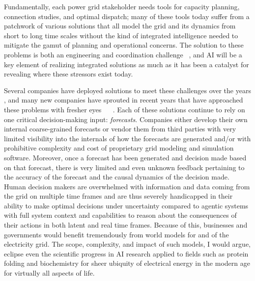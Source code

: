 \documentclass{article}
\begin{document}
Fundamentally, each power grid stakeholder needs tools
for capacity planning, connection studies, and optimal dispatch; many of these tools today suffer
from a patchwork of various solutions that all model the grid and its dynamics from short to long
time scales without the kind of integrated intelligence needed to mitigate the gamut of planning
and operational concerns. The solution to these problems is both an engineering and coordination 
challenge ~\cite{Grindal2026}, and AI will be a key element of realizing integrated solutions as
much as it has been a catalyst for revealing where these stressors exist today.

Several companies have deployed solutions to meet these challenges over the years \cite{OldEnergySoftware}, and many new 
companies have sprouted in recent years that have approached these problems with fresher eyes 
~\cite{Sguazzi2026} ~\cite{Bessemer2026}.
Each of these solutions continue to rely on one critical decision-making input: \emph{forecasts}.
Companies either develop their own internal coarse-grained forecasts or vendor them from third
parties with very limited visibility into the internals of how the forecasts are generated and/or 
with prohibitive complexity and cost of proprietary grid modeling and simulation software.
Moreover, once a forecast has been generated and decision made based on that forecast, there is
very limited and even unknown feedback pertaining to the accuracy of the forecast and the 
causal dynamics of the decision made. Human decision makers are overwhelmed with information
and data coming from the grid on multiple time frames and are thus severely handicapped in their
ability to make optimal decisions under uncertainty compared to agentic systems with full system
context and capabilities to reason about the consequences of their actions in both latent and
real time frames. Because of this, businesses and governments would benefit tremendously from 
world models for and of the electricity grid. The scope, complexity, and impact of such models,
I would argue, eclipse even the scientific progress in AI research applied to fields such as
protein folding and biochemistry for sheer ubiquity of electrical energy in the modern age for
virtually all aspects of life.
\end{document}
